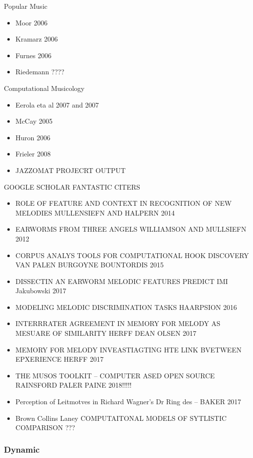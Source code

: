 \documentclass[]{book}
\providecommand{\tightlist}{%
  \setlength{\itemsep}{0pt}\setlength{\parskip}{0pt}}
\theoremstyle{definition}
\theoremstyle{definition}
\theoremstyle{definition}
\theoremstyle{remark}
\begin{document}
Popular Music

\begin{itemize}
\tightlist
\item
  Moor 2006
\item
  Kramarz 2006
\item
  Furnes 2006
\item
  Riedemann ????
\end{itemize}

Computational Musicology

\begin{itemize}
\tightlist
\item
  Eerola eta al 2007 and 2007
\item
  McCay 2005
\item
  Huron 2006
\item
  Frieler 2008
\item
  JAZZOMAT PROJECRT OUTPUT
\end{itemize}

GOOGLE SCHOLAR FANTASTIC CITERS

\begin{itemize}
\item
  ROLE OF FEATURE AND CONTEXT IN RECOGNITION OF NEW MELODIES MULLENSIEFN
  AND HALPERN 2014
\item
  EARWORMS FROM THREE ANGELS WILLIAMSON AND MULLSIEFN 2012
\item
  CORPUS ANALYS TOOLS FOR COMPUTATIONAL HOOK DISCOVERY VAN PALEN
  BURGOYNE BOUNTORDIS 2015
\item
  DISSECTIN AN EARWORM MELODIC FEATURES PREDICT IMI Jakubowski 2017
\item
  MODELING MELODIC DISCRIMINATION TASKS HAARPSION 2016
\item
  INTERRRATER AGREEMENT IN MEMORY FOR MELODY AS MESUARE OF SIMILARITY
  HERFF DEAN OLSEN 2017
\item
  MEMORY FOR MELODY INVEASTIAGTING HTE LINK BVETWEEN EPXERIENCE HERFF
  2017
\item
  THE MUSOS TOOLKIT -- COMPUTER ASED OPEN SOURCE RAINSFORD PALER PAINE
  2018!!!!!
\item
  Perception of Leitmotves in Richard Wagner's Dr Ring des -- BAKER 2017
\item
  Brown Collins Laney COMPUTAITONAL MODELS OF SYTLISTIC COMPARISON ???
\end{itemize}

\hypertarget{dynamic}{%
\subsubsection{Dynamic}\label{dynamic}}
\end{document}
